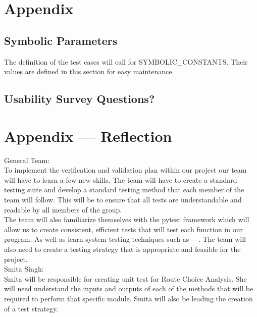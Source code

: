 \documentclass[12pt, titlepage]{article}
\begin{document}




\newpage

\section{Appendix}

\subsection{Symbolic Parameters}

The definition of the test cases will call for SYMBOLIC\_CONSTANTS.
Their values are defined in this section for easy maintenance.

\subsection{Usability Survey Questions?}


\newpage{}
\section*{Appendix --- Reflection}
General Team:\\

\noindent To implement the verification and validation plan within our project our team will have to learn a few new skills. The team will have to create a standard testing suite and develop a standard testing method that each member of the team will follow. This will be to ensure that all tests are understandable and readable by all members of the group. \\

\noindent The team will also familiarize themselves with the pytest framework which will allow us to create consistent, efficient tests that will test each function in our program. As well as learn system testing techniques such as ---.  The team will also need to create a testing strategy that is appropriate and feasible for the project.\\

\noindent Smita Singh:\\ Smita will be responsible for creating unit test for Route Choice Analysis. She will need understand the inputs and outputs of each of the methods that will be required to perform that specific module. Smita will also be leading the creation of a test strategy. \\
\end{document}
